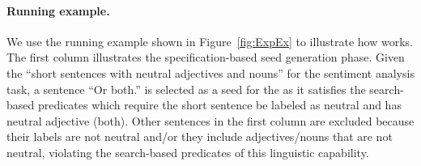 \paragraph*{Running example.} We use the running example shown in Figure~\ref{fig:ExpEx} to illustrate how \tool works. The first column illustrates the specification-based seed generation phase. Given the \lc ``short sentences with neutral adjectives and nouns'' for the sentiment analysis task, a sentence ``Or both.'' is selected as a seed for the \lc as it satisfies the search-based predicates which require the short sentence be labeled as neutral and has neutral adjective (\ie both). Other sentences in the first column are excluded because their labels are not neutral and/or they include adjectives/nouns that are not neutral, violating the search-based predicates of this linguistic capability.






